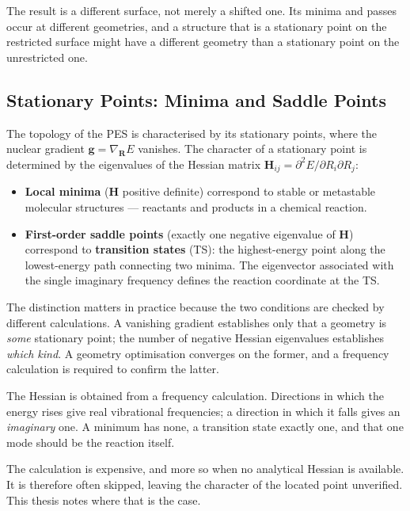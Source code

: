 The result is a different surface, not merely a shifted one. Its minima and passes
occur at different geometries, and a structure that is a stationary point on the
restricted surface might have a different geometry than a stationary point on the unrestricted one.

\subsection{Stationary Points: Minima and Saddle Points}
\label{sec:background-stationary}

The topology of the PES is characterised by its stationary points, where the
nuclear gradient $\mathbf{g} = \nabla_\mathbf{R} E$ vanishes. The character of a
stationary point is determined by the eigenvalues of the Hessian matrix
$\mathbf{H}_{ij} = \partial^2 E / \partial R_i \partial R_j$:

\begin{itemize}
  \item \textbf{Local minima} ($\mathbf{H}$ positive definite) correspond to
    stable or metastable molecular structures --- reactants and products in
    a chemical reaction.
  \item \textbf{First-order saddle points} (exactly one negative eigenvalue of
    $\mathbf{H}$) correspond to \textbf{transition states} (TS): the highest-energy
    point along the lowest-energy path connecting two minima. The eigenvector
    associated with the single imaginary frequency defines the reaction coordinate
    at the TS.
\end{itemize}

The distinction matters in practice because the two conditions are checked by
different calculations. A vanishing gradient establishes only that a geometry is
\emph{some} stationary point; the number of negative Hessian eigenvalues
establishes \emph{which kind}. A geometry optimisation converges on the former,
and a frequency calculation is required to confirm the latter.

The Hessian is obtained from a frequency calculation. Directions in which the
energy rises give real vibrational frequencies; a direction in which it falls
gives an \emph{imaginary} one. A minimum has none, a transition state exactly one,
and that one mode should be the reaction itself.

The calculation is expensive, and more so when no analytical Hessian is available. It is therefore often
skipped, leaving the character of the located point unverified. This thesis notes
where that is the case.

